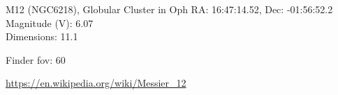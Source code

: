 \begin{block}{M12 (NGC6218), Globular Cluster in Oph}
    RA: 16:47:14.52, Dec: -01:56:52.2 \\ 
    Magnitude (V): 6.07 \\ 
    Dimensions: 11.1 

    Finder fov: 60 

    \url{https://en.wikipedia.org/wiki/Messier_12} 
\end{block}